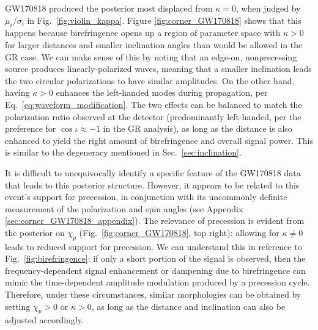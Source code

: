 \documentclass[aps,prd,twocolumn,superscriptaddress,preprintnumbers,floatfix,nofootinbib]{revtex4-2}
\begin{document}
GW170818 produced the posterior most displaced from $\kappa=0$, when judged by $\mu_i/\sigma_i$ in Fig.~\ref{fig:violin_kappa}.
Figure \ref{fig:corner_GW170818} shows that this happens because birefringence opens up a region of parameter space with $\kappa>0$ for larger distances and smaller inclination angles than would be allowed in the GR case.
We can make sense of this by noting that an edge-on, nonprecessing source produces linearly-polarized waves, meaning that a smaller inclination leads the two circular polarizations to have similar amplitudes.
On the other hand, having $\kappa > 0$ enhances the left-handed modes during propagation, per Eq.~\eqref{eq:waveform_modification}.
The two effects can be balanced to match the polarization ratio observed at the detector (predominantly left-handed, per the preference for $\cos\iota \approx -1$ in the \ac{GR} analysis), as long as the distance is also enhanced to yield the right amount of birefringence and overall signal power.
This is similar to the degeneracy mentioned in Sec.~\ref{sec:inclination}.

It is difficult to unequivocally identify a specific feature of the GW170818 data that leads to this posterior structure.
However, it appears to be related to this event's support for precession, in conjunction with its uncommonly definite measurement of the polarization and spin angles \cite{Varma:2021csh} (see Appendix \ref{sec:corner_GW170818_appendix}).
The relevance of precession is evident from the posterior on $\chi_p$ (Fig.~\ref{fig:corner_GW170818}, top right): allowing for $\kappa \neq 0$ leads to reduced support for precession.
We can understand this in reference to Fig.~\ref{fig:birefringence}: if only a short portion of the signal is observed, then the frequency-dependent signal enhancement or dampening due to birefringence can mimic the time-dependent amplitude modulation produced by a precession cycle.
Therefore, under these circumstances, similar morphologies can be obtained by setting $\chi_p > 0$ or $\kappa > 0$, as long as the distance and inclination can also be adjusted accordingly.
\end{document}
